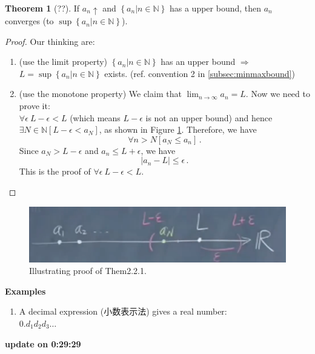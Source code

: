 \documentclass{book}
\theoremstyle{definition}
\newtheorem{theorem}{Theorem}[section]
\begin{document}
\begin{theorem}[??]
   If $a_n\uparrow$ and $\left\{a_n | n\in\mathbb{N}\right\}$ has a upper bound, then $a_n$ converges (to $\sup\left\{ a_n | n \in \mathbb{N}\right\}$).
\end{theorem}
\begin{proof}
Our thinking are:
    \begin{enumerate}
        \item (use the limit property) $\left\{a_n | n\in\mathbb{N}\right\}$ has an upper bound $\Rightarrow$ $L=\sup\left\{ a_n | n\in\mathbb{N} \right\}$ exists. (ref. convention 2 in \ref{subsec:minmaxbound})
        \item (use the monotone property) We claim that $\lim_{n\to\infty} a_n=L$. Now we need to prove it:\\
        $\forall \epsilon~ L-\epsilon<L$ (which means $L-\epsilon$ is not an upper bound) and hence $\exists N\in\mathbb{N}\left[L-\epsilon<a_N \right]$, as shown in Figure \ref{fig:Them2.2.1}. Therefore, we have
        \begin{equation}
            \forall n>N \left[ a_N\leq a_n\right] \,.
        \end{equation}
        Since $a_N>L-\epsilon$ and $a_n\leq L+\epsilon$, we have 
        \begin{equation}
            \left|a_n-L\right|\leq \epsilon \,.
        \end{equation}
        This is the proof of $\forall \epsilon~ L-\epsilon<L$.
    \end{enumerate}
\end{proof}

\begin{figure}
    \centering
    \includegraphics[width=0.7\linewidth]{Them2.2.1.png}
    \caption{Illustrating proof of Them2.2.1.}
    \label{fig:Them2.2.1}
\end{figure}
        
\textbf{Examples}
\begin{enumerate}
    \item A decimal expression (小数表示法) gives a real number: \\
    $0.d_1 d_2 d_3 \dots$
\end{enumerate}




\textbf{update on 0:29:29}
\end{document}
